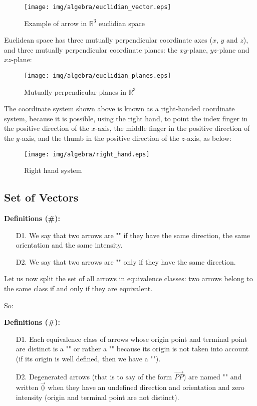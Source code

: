 \begin{figure}[H]
\centering
\texttt{[image: img/algebra/euclidian\_vector.eps]}
\caption{Example of arrow in $\mathbb{R}^3$ euclidian space}
\end{figure}

Euclidean space has three mutually perpendicular coordinate axes ($x$, $y$ and $z$), and three
mutually perpendicular coordinate planes: the $xy$-plane, $yz$-plane and $xz$-plane:

\begin{figure}[H]
\centering
\texttt{[image: img/algebra/euclidian\_planes.eps]}
\caption{Mutually perpendicular planes in $\mathbb{R}^3$}
\end{figure}

The coordinate system shown above is known as a right-handed coordinate system, because it is possible, using the right hand, to point the index finger in the positive direction of the $x$-axis, the middle finger in the positive direction of the $y$-axis, and the thumb in the positive direction of the $z$-axis, as below:

\begin{figure}[H]
\centering
\texttt{[image: img/algebra/right\_hand.eps]}
\caption{Right hand system}
\end{figure}


	\subsection{Set of Vectors}	

\textbf{Definitions (\#\mydef):}

	\begin{enumerate}
		\item[D1.] We say that two arrows are ""   if they have the same direction, the same orientation and the same intensity.
		\item[D2.] We say that two arrows are "" only if they have the same direction.
	\end{enumerate}
Let us now split the set of all arrows in equivalence classes: two arrows belong to the same class if and only if they are equivalent.

So:

\textbf{Definitions (\#\mydef):} 

\begin{enumerate}
	\item[D1.]Each equivalence class of arrows whose origin point and terminal point are distinct is a "" or rather a "" because its origin is not taken into account (if its origin is well defined, then we have a "").
	\item[D2.]Degenerated arrows (that is to say of the form $\overrightarrow{PP}$) are named "" and written $\vec{0}$ when they have an undefined direction and orientation and zero intensity (origin and terminal point are not distinct).
\end{enumerate}	

